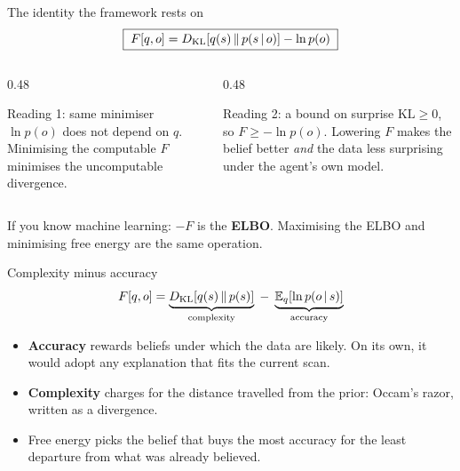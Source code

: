 \documentclass[10pt, aspectratio=169]{beamer}
\begin{document}
\begin{frame}{The identity the framework rests on}
  \[ \boxed{\; F[q,o] = D_{\mathrm{KL}}\!\left[q(s)\,\middle\|\,p(s\,|\, o)\right] - \ln p(o) \;} \]
  \begin{columns}[T]
    \begin{column}{0.48\textwidth}
      \begin{block}{Reading 1: same minimiser}
        $\ln p(o)$ does not depend on $q$. Minimising the computable $F$ minimises the
        uncomputable divergence.
      \end{block}
    \end{column}
    \begin{column}{0.48\textwidth}
      \begin{block}{Reading 2: a bound on surprise}
        $\mathrm{KL}\ge 0$, so $F \ge -\ln p(o)$. Lowering $F$ makes the belief better \emph{and}
        the data less surprising under the agent's own model.
      \end{block}
    \end{column}
  \end{columns}
  \vspace{0.8em}
  If you know machine learning: $-F$ is the \textbf{ELBO}. Maximising the ELBO and minimising free
  energy are the same operation.
\end{frame}

\begin{frame}{Complexity minus accuracy}
  \[
    F[q,o] = \underbrace{D_{\mathrm{KL}}\!\left[q(s)\,\middle\|\,p(s)\right]}_{\text{complexity}}
             \;-\; \underbrace{\mathbb{E}_q\!\left[\ln p(o\,|\, s)\right]}_{\text{accuracy}}
  \]
  \begin{itemize}
    \item \textbf{Accuracy} rewards beliefs under which the data are likely. On its own, it would
          adopt any explanation that fits the current scan.
    \item \textbf{Complexity} charges for the distance travelled from the prior: Occam's razor,
          written as a divergence.
    \item Free energy picks the belief that buys the most accuracy for the least departure from
          what was already believed.
  \end{itemize}
\end{frame}
\end{document}

